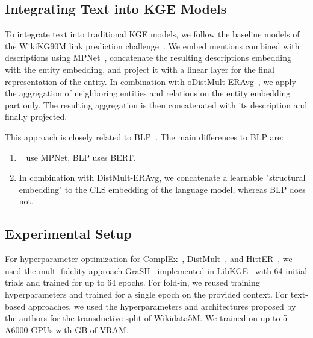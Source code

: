 \documentclass[11pt]{article}
\renewcommand\:{\colon} \newcommand{\sset}[1]{\left\{\,#1\,\right\}} \newcommand{\ssets}[1]{\left\{#1\right\}} \newcommand{\ssetn}[1]{\{\,#1\,\}}
\begin{document}
\subsection{Integrating Text into KGE Models}
\label{sec:text_kge}


To integrate text into traditional KGE models, we follow the baseline models of the WikiKG90M link prediction challenge~\cite{hu2021ogblsc}.
We embed mentions combined with descriptions using MPNet~\cite{song2020mpnet}, concatenate the resulting descriptions embedding with the entity embedding, and project it with a linear layer for the final representation of the entity.
In combination with oDistMult-ERAvg~\cite{albooyeh2020out}, we apply the aggregation of neighboring entities and relations on the entity embedding part only.
The resulting aggregation is then concatenated with its description and finally projected.

\balance
This approach is closely related to BLP~\cite{daza2021inductive}.
The main differences to BLP are:
\begin{enumerate}
\item~\citet{hu2021ogblsc} use MPNet, BLP uses BERT.
  \item In combination with DistMult-ERAvg, we concatenate a learnable "structural embedding" to the CLS embedding of the language model, whereas BLP does not.
\end{enumerate}



\subsection{Experimental Setup}
\label{sec:experimental_setup}

For hyperparameter optimization for ComplEx~\cite{trouillon2016complex}, DistMult~\cite{yang2015embedding}, and HittER~\cite{chen2021hitter}, we used the multi-fidelity approach GraSH~\cite{kochsiek2023start} implemented in LibKGE~\cite{libkge} with 64 initial trials and trained for up to 64 epochs.
For fold-in, we reused training hyperparameters and trained for a single epoch on the provided context.
For text-based approaches, we used the hyperparameters and architectures proposed by the authors for the transductive split of Wikidata5M.
We trained on up to 5 A6000-GPUs with GB of VRAM.
\end{document}
